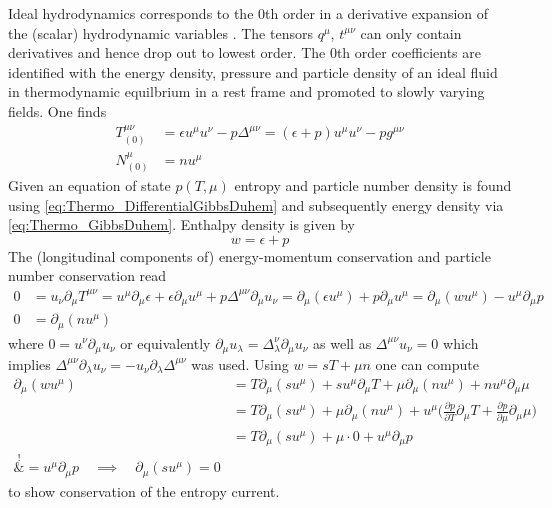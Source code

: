 Ideal hydrodynamics corresponds to the $0$th order in a derivative expansion of the (scalar) hydrodynamic variables . The tensors $q^\mu$, $t^{\mu\nu}$ can only contain derivatives and hence drop out to lowest order. The $0$th order coefficients are identified with the energy density, pressure and particle density of an ideal fluid in thermodynamic equilbrium in a rest frame and promoted to slowly varying fields. One finds
\begin{subequations}
    \begin{align}
        T^{\mu\nu}_{(0)} & =\epsilon u^\mu u^\nu-p\Delta^{\mu\nu} =(\epsilon+p)u^\mu u^\nu-pg^{\mu\nu} \\
        N^\mu_{(0)}      & =nu^\mu
    \end{align}
\end{subequations}
Given an equation of state $p(T,\mu)$ entropy and particle number density is found using \eqref{eq:Thermo_DifferentialGibbsDuhem} and subsequently energy density via \eqref{eq:Thermo_GibbsDuhem}. Enthalpy density is given by
\begin{equation}
    w=\epsilon+p
\end{equation}
The (longitudinal components of) energy-momentum conservation and particle number conservation read
\begin{subequations}
    \begin{align}
        0 & =u_\nu\partial_\mu T^{\mu\nu}=u^\mu\partial_\mu\epsilon+\epsilon\partial_\mu u^\mu+p\Delta^{\mu\nu}\partial_\mu u_\nu=\partial_\mu(\epsilon u^\mu)+p\partial_\mu u^\mu=\partial_\mu(wu^\mu)-u^\mu\partial_\mu p \\
        0 & = \partial_\mu (nu^\mu)
    \end{align}
    \label{eq:FluidMechanics_0thOrderConservationLaws}
\end{subequations}
where $0=u^\nu\partial_\mu u_\nu$ or equivalently $\partial_\mu u_\lambda=\Delta^\nu_\lambda\partial_\mu u_\nu$ as well as $\Delta^{\mu\nu}u_\nu=0$ which implies $\Delta^{\mu\nu}\partial_\lambda u_\nu=-u_\nu\partial_\lambda\Delta^{\mu\nu}$ was used. Using $w=sT+\mu n$ one can compute
\begin{align*}
    \partial_\mu(w u^\mu) & =T\partial_\mu(su^\mu)+su^\mu\partial_\mu T+\mu\partial_\mu (nu^\mu)+nu^\mu\partial_\mu\mu                                                                \\
                          & =T\partial_\mu(su^\mu)+\mu\partial_\mu (nu^\mu)+u^\mu\Big(\frac{\partial p}{\partial T}\partial_\mu T+\frac{\partial p}{\partial \mu}\partial_\mu\mu\Big) \\
                          & =T\partial_\mu(su^\mu)+\mu\cdot 0+u^\mu\partial_\mu p                                                                                                     \\
    \overset{!}           & {=}u^\mu\partial_\mu p\quad\implies\quad\partial_\mu(su^\mu)=0
\end{align*}
to show conservation of the entropy current.

